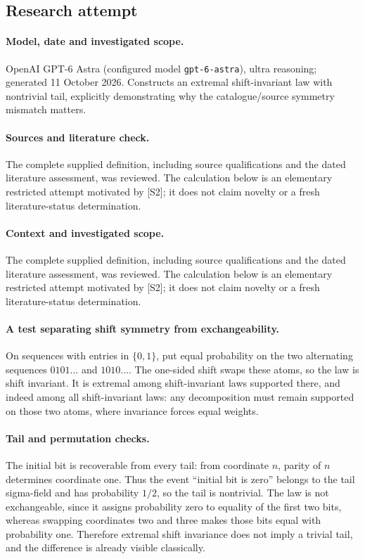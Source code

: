 \documentclass[11pt]{article}
\begin{document}
\subsection{Research attempt}
\paragraph{Model, date and investigated scope.}
OpenAI GPT-6 Astra (configured model \texttt{gpt-6-astra}), ultra reasoning; generated 11 October 2026. Constructs an extremal shift-invariant law with nontrivial tail, explicitly demonstrating why the catalogue/source symmetry mismatch matters.

\paragraph{Sources and literature check.}
The complete supplied definition, including source qualifications and the dated literature assessment, was reviewed. The calculation below is an elementary restricted attempt motivated by [S2]; it does not claim novelty or a fresh literature-status determination.

\paragraph{Context and investigated scope.} The complete supplied definition, including source qualifications and the dated literature assessment, was reviewed. The calculation below is an elementary restricted attempt motivated by [S2]; it does not claim novelty or a fresh literature-status determination.

\paragraph{A test separating shift symmetry from exchangeability.} On sequences with entries in $\{0,1\}$, put equal probability on the two alternating sequences $0101\ldots$ and $1010\ldots$. The one-sided shift swaps these atoms, so the law is shift invariant. It is extremal among shift-invariant laws supported there, and indeed among all shift-invariant laws: any decomposition must remain supported on those two atoms, where invariance forces equal weights.

\paragraph{Tail and permutation checks.} The initial bit is recoverable from every tail: from coordinate $n$, parity of $n$ determines coordinate one. Thus the event ``initial bit is zero'' belongs to the tail sigma-field and has probability $1/2$, so the tail is nontrivial. The law is not exchangeable, since it assigns probability zero to equality of the first two bits, whereas swapping coordinates two and three makes those bits equal with probability one. Therefore extremal shift invariance does not imply a trivial tail, and the difference is already visible classically.
\end{document}
